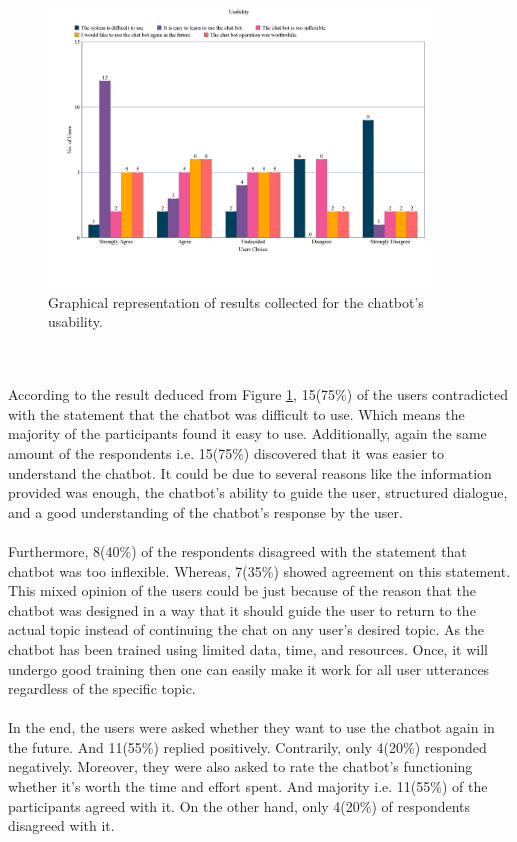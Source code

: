 \begin{figure}[!h]
    \centering
    \includegraphics[width=0.9\textwidth]{img/Usability_Updated.png}
    \caption{Graphical representation of results collected for the chatbot's usability.}
    \label{fig:usabil}
\end{figure}
\\~\\
According to the result deduced from Figure \ref{fig:usabil}, 15(75\%) of the users contradicted with the statement that the chatbot was difficult to use. Which means the majority of the participants found it easy to use. Additionally, again the same amount of the respondents i.e. 15(75\%) discovered that it was easier to understand the chatbot. It could be due to several reasons like the information provided was enough, the chatbot's ability to guide the user, structured dialogue, and a good understanding of the chatbot's response by the user.
\\~\\
Furthermore, 8(40\%) of the respondents disagreed with the statement that chatbot was too inflexible. Whereas, 7(35\%) showed agreement on this statement. This mixed opinion of the users could be just because of the reason that the chatbot was designed in a way that it should guide the user to return to the actual topic instead of continuing the chat on any user's desired topic. As the chatbot has been trained using limited data, time, and resources. Once, it will undergo good training then one can easily make it work for all user utterances regardless of the specific topic.
\\~\\
In the end, the users were asked whether they want to use the chatbot again in the future. And 11(55\%) replied positively. Contrarily, only 4(20\%) responded negatively. Moreover, they were also asked to rate the chatbot's functioning whether it's worth the time and effort spent. And majority i.e. 11(55\%) of the participants agreed with it. On the other hand, only 4(20\%) of respondents disagreed with it.

